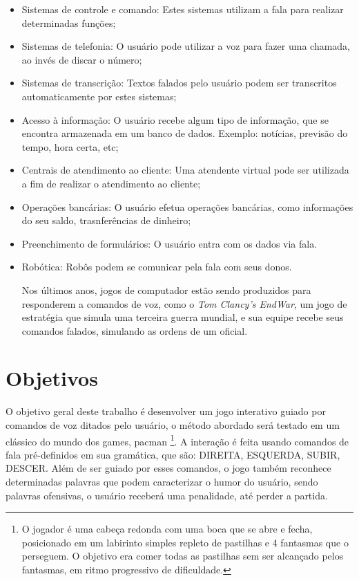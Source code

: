 \begin{itemize}
\item Sistemas de controle e comando: Estes sistemas utilizam a fala para realizar
determinadas funções;
\item Sistemas de telefonia: O usuário pode utilizar a voz para fazer uma chamada, ao
invés de discar o número;
\item Sistemas de transcrição: Textos falados pelo usuário podem ser transcritos
automaticamente por estes sistemas;
\item Acesso à informação: O usuário recebe algum tipo de informação, que se encontra armazenada em um banco de dados. Exemplo: notícias, previsão do tempo, hora certa, etc;
\item Centrais de atendimento ao cliente: Uma atendente virtual pode ser utilizada a fim
de realizar o atendimento ao cliente;
\item Operações bancárias: O usuário efetua operações bancárias, como informações do seu saldo, trasnferências de dinheiro;
\item Preenchimento de formulários: O usuário entra com os dados via fala.
\item Robótica: Robôs podem se comunicar pela fala com seus donos.

Nos últimos anos, jogos de computador estão sendo produzidos para responderem a comandos de voz, como o \textit{Tom Clancy's EndWar}, um jogo de estratégia que simula uma terceira guerra mundial, e sua equipe recebe seus comandos falados, simulando as ordens de um oficial.
\end{itemize}

\section{Objetivos}
O objetivo geral deste trabalho é desenvolver um jogo interativo guiado por comandos de voz ditados pelo usuário, o método abordado será testado em um clássico do mundo dos games, pacman \footnote{ O jogador é uma cabeça redonda com uma boca que se abre e fecha, posicionado em um labirinto simples repleto de pastilhas e 4 fantasmas que o perseguem. O objetivo era comer todas as pastilhas sem ser alcançado pelos fantasmas, em ritmo progressivo de dificuldade.}. A interação é feita usando comandos de fala pré-definidos em sua gramática, que são: DIREITA, ESQUERDA, SUBIR, DESCER. Além de ser guiado por esses comandos, o jogo também reconhece determinadas palavras que podem caracterizar o humor do usuário, sendo palavras ofensivas, o usuário receberá uma penalidade, até perder a partida. 

